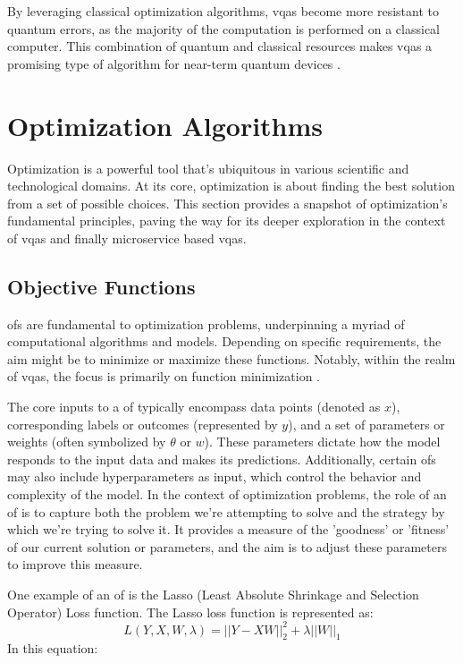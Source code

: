 \documentclass[
  a4paper,  %
  twoside,  %
  bibliography=totoc,
  headsepline,
  cleardoublepage=empty,
  parskip=half,
  draft=false
]{scrbook}
\begin{document}
By leveraging classical optimization algorithms, \glspl{vqa} become more resistant to quantum errors, as the majority of the computation is performed on a classical computer.
This combination of quantum and classical resources makes \glspl{vqa} a promising type of algorithm for near-term quantum devices \cite{Moll2017}.


\section{Optimization Algorithms}
\label{sec:optimizationAlgorithms}
Optimization is a powerful tool that's ubiquitous in various scientific and technological domains.
At its core, optimization is about finding the best solution from a set of possible choices.
This section provides a snapshot of optimization's fundamental principles, paving the way for its deeper exploration in the context of \glspl{vqa} and finally microservice based \glspl{vqa}.

\subsection{Objective Functions}
\label{subsec:objectiveFunctions}
\glspl{of} are fundamental to optimization problems, underpinning a myriad of computational algorithms and models.
Depending on specific requirements, the aim might be to minimize or maximize these functions.
Notably, within the realm of \glspl{vqa}, the focus is primarily on function minimization \cite{Weinan2017}.

The core inputs to a \gls{of} typically encompass data points (denoted as $x$), corresponding labels or outcomes (represented by $y$), and a set of parameters or weights (often symbolized by $\theta$ or $w$).
These parameters dictate how the model responds to the input data and makes its predictions.
Additionally, certain \glspl{of} may also include hyperparameters as input, which control the behavior and complexity of the model.
In the context of optimization problems, the role of an \gls{of} is to capture both the problem we're attempting to solve and the strategy by which we're trying to solve it.
It provides a measure of the 'goodness' or 'fitness' of our current solution or parameters, and the aim is to adjust these parameters to improve this measure.

One example of an \gls{of} is the Lasso (Least Absolute Shrinkage and Selection Operator) Loss function.
The Lasso loss function is represented as:
\[
L(Y, X, W, \lambda) = ||Y - XW||^2_2 + \lambda ||W||_1
\]
In this equation:
\end{document}
